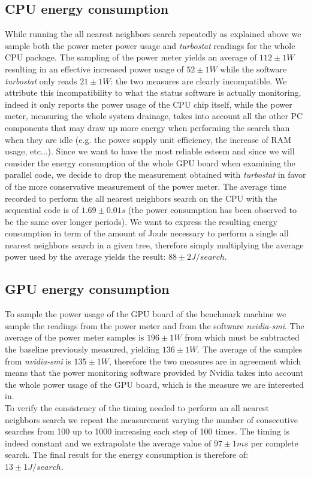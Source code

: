 \subsection{CPU energy consumption}
While running the all nearest neighbors search repeatedly as explained above we sample both the power meter power usage and \textit{turbostat} readings for the whole CPU package. The sampling of the power meter yields an average of $112 \pm 1 \unit{W}$ resulting in an effective increased power usage of $52 \pm 1 \unit{W}$ while the software \textit{turbostat} only reads $21 \pm 1 \unit{W}$: the two measures are clearly incompatible. We attribute this incompatibility to what the status software is actually monitoring, indeed it only reports the power usage of the CPU chip itself, while the power meter, measuring the whole system drainage, takes into account all the other PC components that may draw up more energy when performing the search than when they are idle (e.g. the power supply unit efficiency, the increase of RAM usage, etc...). Since we want to have the most reliable esteem and since we will consider the energy consumption of the whole GPU board when examining the parallel code, we decide to drop the measurement obtained with \textit{turbostat} in favor of the more conservative measurement of the power meter. The average time recorded to perform the all nearest neighbors search on the CPU with the sequential code is of $1.69 \pm 0.01 \unit{s}$ (the power consumption has been observed to be the same over longer periods). We want to express the resulting energy consumption in term of the amount of Joule necessary to perform a single all nearest neighbors search in a given tree, therefore simply multiplying the average power used by the average yields the result: $88 \pm 2 \unit{J/search}$.

\subsection{GPU energy consumption}
To sample the power usage of the GPU board of the benchmark machine we sample the readings from the power meter and from the software \textit{nvidia-smi}. The average of the power meter samples is $196 \pm 1 \unit{W}$ from which must be subtracted the baseline previously measured, yielding $136 \pm 1 \unit{W}$. The average of the samples from \textit{nvidia-smi} is $135 \pm 1 \unit{W}$, therefore the two measures are in agreement which means that the power monitoring software provided by Nvidia takes into account the whole power usage of the GPU board, which is the measure we are interested in.\\
To verify the consistency of the timing needed to perform an all nearest neighbors search we repeat the measurement varying the number of consecutive searches from 100 up to 1000 increasing each step of 100 times. The timing is indeed constant and we extrapolate the average value of $97 \pm 1 \unit{ms}$ per complete search. The final result for the energy consumption is therefore of: $13 \pm 1 \unit{J/search}$.

